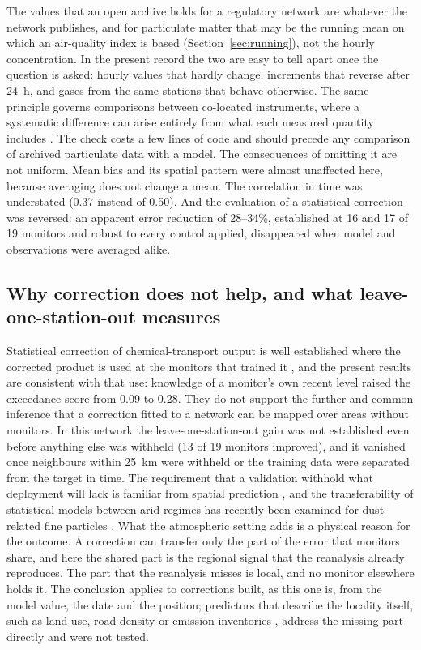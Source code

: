 The values that an open archive holds for a regulatory network are whatever the network
publishes, and for particulate matter that may be the running mean on which an air-quality index
is based (Section~\ref{sec:running}), not the hourly concentration. In the present record the two are easy
to tell apart once the question is asked: hourly values that hardly change, increments that
reverse after 24~h, and gases from the same stations that behave otherwise. The same principle governs comparisons
between co-located instruments, where a systematic difference can arise entirely from what each
measured quantity includes \citep{you2026nai}. The check costs a
few lines of code and should precede any comparison of archived particulate data with a model.
The consequences of omitting it are not uniform. Mean bias and its spatial pattern were almost
unaffected here, because averaging does not change a mean. The correlation in time was
understated (0.37 instead of 0.50). And the evaluation of a statistical correction was
reversed: an apparent error reduction of 28--34\%, established at 16 and 17 of 19 monitors and
robust to every control applied, disappeared when model and observations were averaged alike.

\subsection{Why correction does not help, and what leave-one-station-out measures}

Statistical correction of chemical-transport output is well established where the corrected
product is used at the monitors that trained it \citep{djalalova2015,huang2017}, and the present
results are consistent with that use: knowledge of a monitor's own recent level raised the
exceedance score from 0.09 to 0.28. They do not support the further and common inference that a
correction fitted to a network can be mapped over areas without monitors. In this network the
leave-one-station-out gain was not established even before anything else was withheld (13 of 19
monitors improved), and it vanished once neighbours within 25~km were withheld or the training data
were separated from the target in time.
The requirement that a validation withhold what deployment will lack is familiar from
spatial prediction \citep{roberts2017,ploton2020,wadoux2021}, and the transferability of
statistical models between arid regimes has recently been examined for dust-related fine
particles \citep{hurynovich2026}. What the atmospheric setting adds is a physical reason for the
outcome. A correction can transfer only the part of the error that monitors share, and here the
shared part is the regional signal that the reanalysis already reproduces. The part that the
reanalysis misses is local, and no monitor elsewhere holds it. The conclusion applies to
corrections built, as this one is, from the model value, the date and the position; predictors
that describe the locality itself, such as land use, road density or emission inventories
\citep{zhang2018lur}, address the missing part directly and were not tested.

